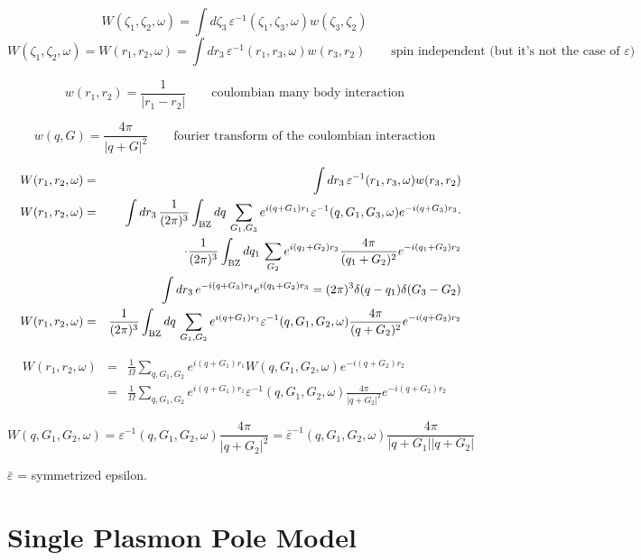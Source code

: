 \documentclass[fleqn]{article}
\begin{document}
\[
W(\zeta_1,\zeta_2,\omega) = \int d\zeta_3 \, \varepsilon^{-1}(\zeta_1,\zeta_3,\omega) w(\zeta_3,\zeta_2)
\]
\[
W(\zeta_1,\zeta_2,\omega) =
W(r_1,r_2,\omega) = \int dr_3 \, \varepsilon^{-1}(r_1,r_3,\omega) w(r_3,r_2)
\qquad \textrm{spin independent (but it's not the case of $\varepsilon$)}
\]

\[
  w(r_1,r_2) = \frac{1}{|r_1-r_2|}
  \qquad \textrm{coulombian many body interaction}
\]

\[
  w(q,G) = \frac{4 \pi}{|q+G|^2}
  \qquad \textrm{fourier transform of the coulombian interaction}
\]

\begin{eqnarray*}
\quad
W(r_1,r_2,\omega) &=& \int dr_3 \, \varepsilon^{-1}(r_1,r_3,\omega) w(r_3,r_2) \\
W(r_1,r_2,\omega)
  &=& \int dr_3 \, \frac{1}{(2\pi)^3} \int_{\rm BZ} dq \, \sum_{G_1,G_3} e^{i (q+G_1) r_1}
  \varepsilon^{-1}(q,G_1,G_3,\omega) e^{-i (q+G_3) r_3} \cdot \\ && \cdot
  \frac{1}{(2\pi)^3} \int_{\rm BZ} dq_1\, \sum_{G_2} e^{i (q_1+G_2) r_3}
  \frac{4\pi}{(q_1+G_2)^2} e^{-i (q_1+G_2) r_2} \\ &&
  \int dr_3 \, e^{-i (q+G_3) r_3} e^{i (q_1+G_2) r_3} = (2\pi)^3 \delta(q-q_1) \delta(G_3-G_2) \\
  W(r_1,r_2,\omega)
  &=& \frac{1}{(2\pi)^3} \int_{\rm BZ} dq \, \sum_{G_1,G_2} e^{i (q+G_1) r_1}
  \varepsilon^{-1}(q,G_1,G_2,\omega)  \frac{4\pi}{(q+G_2)^2} e^{-i (q+G_2) r_2}
\end{eqnarray*}

\begin{eqnarray*}
W(r_1,r_2,\omega) &=& \frac{1}{\Omega} \sum_{q,G_1,G_2}
e^{i (q+G_1) r_1} W(q,G_1,G_2,\omega) e^{-i (q+G_2) r_2} \\
&=&  \frac{1}{\Omega} \sum_{q,G_1,G_2}
  e^{i (q+G_1) r_1} \varepsilon^{-1}(q,G_1,G_2,\omega) \frac{4\pi}{|q+G_2|^2} e^{-i (q+G_2) r_2}
\end{eqnarray*}

\[
W(q,G_1,G_2,\omega) =
\varepsilon^{-1}(q,G_1,G_2,\omega) \frac{4 \pi}{|q+G_2|^2}
= \bar{\varepsilon}^{-1}(q,G_1,G_2,\omega) \frac{4 \pi}{|q+G_1| |q+G_2|}
\]

$\bar{\varepsilon}$ = symmetrized epsilon.

\newpage


\section{Single Plasmon Pole Model}
\end{document}
